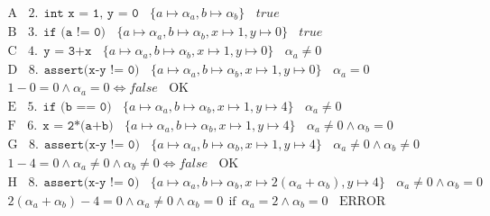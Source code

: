\documentclass[10pt]{article}
\begin{document}
\begin{align*}\mbox{A} ~~~~ 2.~~\texttt{int x = 1, y = 0} ~~~~ \{ a\mapsto \alpha_a, b\mapsto \alpha_b \} ~~~~ true \\
\mbox{B} ~~~~ 3.~~\texttt{if (a != 0)} ~~~~ \{ a\mapsto \alpha_a, b\mapsto \alpha_b, x\mapsto 1, y\mapsto 0 \} ~~~~ true \\
\mbox{C} ~~~~ 4.~~\texttt{y = 3+x} ~~~~ \{ a\mapsto \alpha_a, b\mapsto \alpha_b, x\mapsto 1, y\mapsto 0 \} ~~~~ \alpha_a\neq 0 \\
\mbox{D} ~~~~ 8.~~\texttt{assert(x-y != 0)} ~~~~ \{ a\mapsto \alpha_a, b\mapsto \alpha_b, x\mapsto 1, y\mapsto 0 \} ~~~~ \alpha_a= 0 \\
1-0 = 0 \wedge \alpha_a = 0\Longleftrightarrow false ~~~~ \mbox{OK} \\
\mbox{E} ~~~~ 5.~~\texttt{if (b == 0)} ~~~~ \{ a\mapsto \alpha_a, b\mapsto \alpha_b, x\mapsto 1, y\mapsto 4 \} ~~~~ \alpha_a\neq 0 \\
\mbox{F} ~~~~ 6.~~\texttt{x = 2*(a+b)} ~~~~ \{ a\mapsto \alpha_a, b\mapsto \alpha_b, x\mapsto 1, y\mapsto 4 \} ~~~~ \alpha_a\neq 0 \wedge \alpha_b = 0 \\
\mbox{G} ~~~~ 8.~~\texttt{assert(x-y != 0)} ~~~~ \{ a\mapsto \alpha_a, b\mapsto \alpha_b, x\mapsto 1, y\mapsto 4 \} ~~~~ \alpha_a \neq 0 \wedge \alpha_b \neq 0 \\
1-4 = 0 \wedge \alpha_a \neq 0 \wedge \alpha_b \neq 0\Longleftrightarrow false ~~~~ \mbox{OK} \\
\mbox{H} ~~~~ 8.~~\texttt{assert(x-y != 0)} ~~~~ \{ a\mapsto \alpha_a, b\mapsto \alpha_b, x\mapsto 2(\alpha_a+\alpha_b), y\mapsto 4 \} ~~~~ \alpha_a \neq 0 \wedge \alpha_b = 0 \\
2(\alpha_a+\alpha_b)-4 = 0 \wedge \alpha_a \neq 0 \wedge \alpha_b = 0~~\mbox{if}~~\alpha_a=2\wedge\alpha_b=0 ~~~~ \mbox{ERROR} \\
\end{align*}
\end{document}
